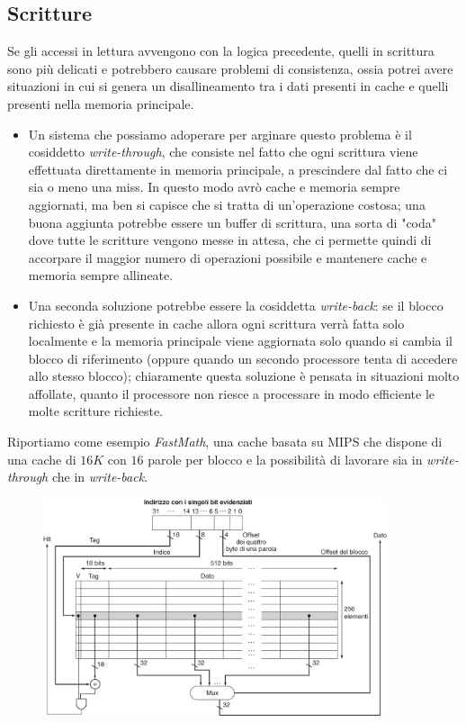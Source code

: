 \documentclass[class=book, crop=false, oneside]{standalone}
\begin{document}
\subsection{Scritture}
Se gli accessi in lettura avvengono con la logica precedente, quelli in scrittura sono più delicati e potrebbero causare problemi di consistenza, ossia potrei avere situazioni in cui si genera un disallineamento tra i dati presenti in cache e quelli presenti nella memoria principale.
\begin{itemize}
	\item Un sistema che possiamo adoperare per arginare questo problema è il cosiddetto \emph{write-through}, che consiste nel fatto che ogni scrittura viene effettuata direttamente in memoria principale, a prescindere dal fatto che ci sia o meno una miss. In questo modo avrò cache e memoria sempre aggiornati, ma ben si capisce che si tratta di un'operazione costosa; una buona aggiunta potrebbe essere un buffer di scrittura, una sorta di "coda" dove tutte le scritture vengono messe in attesa, che ci permette quindi di accorpare il maggior numero di operazioni possibile e mantenere cache e memoria sempre allineate.
	\item Una seconda soluzione potrebbe essere la cosiddetta \emph{write-back}: se il blocco richiesto è già presente in cache allora ogni scrittura verrà fatta solo localmente e la memoria principale viene aggiornata solo quando si cambia il blocco di riferimento (oppure quando un secondo processore tenta di accedere allo stesso blocco); chiaramente questa soluzione è pensata in situazioni molto affollate, quanto il processore non riesce a processare in modo efficiente le molte scritture richieste.
\end{itemize}
Riportiamo come esempio \emph{FastMath}, una cache basata su MIPS che dispone di una cache di \(16K\) con \(16\) parole per blocco e la possibilità di lavorare sia in \emph{write-through} che in \emph{write-back}.

\begin{figure}[H]
	\centering
	\includegraphics[width=0.9\textwidth,keepaspectratio]{astmips}
\end{figure}
\end{document}

